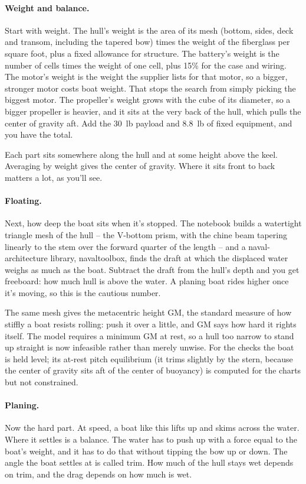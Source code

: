 \documentclass[11pt,a4paper]{article}
\renewcommand{\_}{\textunderscore\allowbreak}
\begin{document}
\paragraph{Weight and balance.} Start with weight. The hull's weight is the area of its mesh (bottom, sides, deck and transom, including the tapered bow) times the weight of the fiberglass per square foot, plus a fixed allowance for structure.
The battery's weight is the number of cells times the weight of one cell, plus 15\% for the case and wiring. The motor's weight is the weight the supplier lists for that motor, so a bigger, stronger motor costs boat weight. That stops the search from simply picking the biggest motor. The propeller's weight grows with the cube of its diameter, so a bigger propeller is heavier, and it sits at the very back of the hull, which pulls the center of gravity aft.
Add the 30~lb payload and 8.8~lb of fixed equipment, and you have the total.

Each part sits somewhere along the hull and at some height above the keel. Averaging by weight gives the center of gravity. Where it sits front to back matters a lot, as you'll see.

\paragraph{Floating.} Next, how deep the boat sits when it's stopped. The notebook builds a watertight triangle mesh of the hull -- the V-bottom prism, with the chine beam tapering linearly to the stem over the forward quarter of the length -- and a naval-architecture library, navaltoolbox, finds the draft at which the displaced water weighs as much as the boat. Subtract the draft from the hull's depth and you get freeboard: how much hull is above the water. A planing boat rides higher once it's moving, so this is the cautious number.

The same mesh gives the metacentric height GM, the standard measure of how stiffly a boat resists rolling: push it over a little, and GM says how hard it rights itself. The model requires a minimum GM at rest, so a hull too narrow to stand up straight is now infeasible rather than merely unwise. For the checks the boat is held level; its at-rest pitch equilibrium (it trims slightly by the stern, because the center of gravity sits aft of the center of buoyancy) is computed for the charts but not constrained.

\paragraph{Planing.} Now the hard part. At speed, a boat like this lifts up and skims across the water. Where it settles is a balance. The water has to push up with a force equal to the boat's weight,
and it has to do that without tipping the bow up or down. The angle the boat settles at is called trim. How much of the hull stays wet depends on trim, and the drag depends on how much is wet.
\end{document}
